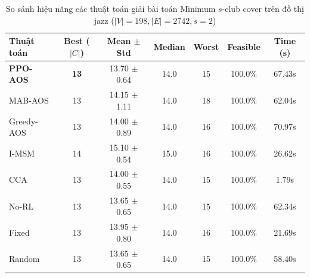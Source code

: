 \begin{table}[htbp]
\centering
\caption{So sánh hiệu năng các thuật toán giải bài toán Minimum $s$-club cover trên đồ thị jazz ($|V|=198, |E|=2742, s=2$)}
\label{tab:results_jazz}
\begin{tabular}{lcccccc}
\hline
\textbf{Thuật toán} & \textbf{Best ($|C|$)} & \textbf{Mean $\pm$ Std} & \textbf{Median} & \textbf{Worst} & \textbf{Feasible} & \textbf{Time (s)} \\
\hline
\textbf{PPO-AOS} & \textbf{13} & 13.70 $\pm$ 0.64 & 14.0 & 15 & 100.0\% & 67.43s \\
MAB-AOS & 13 & 14.15 $\pm$ 1.11 & 14.0 & 18 & 100.0\% & 62.04s \\
Greedy-AOS & 13 & 14.00 $\pm$ 0.89 & 14.0 & 16 & 100.0\% & 70.97s \\
I-MSM & 14 & 15.10 $\pm$ 0.54 & 15.0 & 16 & 100.0\% & 26.62s \\
CCA & 13 & 14.00 $\pm$ 0.55 & 14.0 & 15 & 100.0\% & 1.79s \\
No-RL & 13 & 13.65 $\pm$ 0.65 & 14.0 & 15 & 100.0\% & 62.34s \\
Fixed & 13 & 13.95 $\pm$ 0.80 & 14.0 & 16 & 100.0\% & 21.69s \\
Random & 13 & 13.65 $\pm$ 0.65 & 14.0 & 15 & 100.0\% & 58.40s \\
\hline
\end{tabular}
\end{table}
